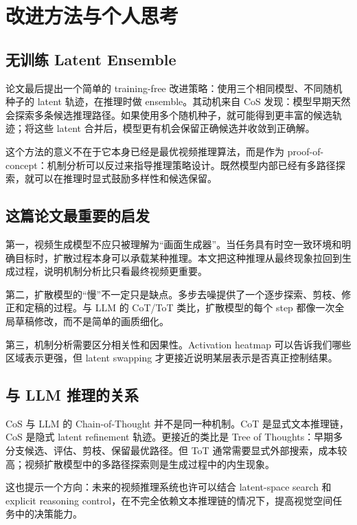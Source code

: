\section{改进方法与个人思考}

\subsection{无训练 Latent Ensemble}

论文最后提出一个简单的 training-free 改进策略：使用三个相同模型、不同随机种子的 latent 轨迹，在推理时做 ensemble。其动机来自 CoS 发现：模型早期天然会探索多条候选推理路径。如果使用多个随机种子，就可能得到更丰富的候选轨迹；将这些 latent 合并后，模型更有机会保留正确候选并收敛到正确解。

这个方法的意义不在于它本身已经是最优视频推理算法，而是作为 proof-of-concept：机制分析可以反过来指导推理策略设计。既然模型内部已经有多路径探索，就可以在推理时显式鼓励多样性和候选保留。

\subsection{这篇论文最重要的启发}

第一，视频生成模型不应只被理解为“画面生成器”。当任务具有时空一致环境和明确目标时，扩散过程本身可以承载某种推理。本文把这种推理从最终现象拉回到生成过程，说明机制分析比只看最终视频更重要。

第二，扩散模型的“慢”不一定只是缺点。多步去噪提供了一个逐步探索、剪枝、修正和定稿的过程。与 LLM 的 CoT/ToT 类比，扩散模型的每个 step 都像一次全局草稿修改，而不是简单的画质细化。

第三，机制分析需要区分相关性和因果性。Activation heatmap 可以告诉我们哪些区域表示更强，但 latent swapping 才更接近说明某层表示是否真正控制结果。

\subsection{与 LLM 推理的关系}

CoS 与 LLM 的 Chain-of-Thought 并不是同一种机制。CoT 是显式文本推理链，CoS 是隐式 latent refinement 轨迹。更接近的类比是 Tree of Thoughts：早期多分支候选、评估、剪枝、保留最优路径。但 ToT 通常需要显式外部搜索，成本较高；视频扩散模型中的多路径探索则是生成过程中的内生现象。

这也提示一个方向：未来的视频推理系统也许可以结合 latent-space search 和 explicit reasoning control，在不完全依赖文本推理链的情况下，提高视觉空间任务中的决策能力。

